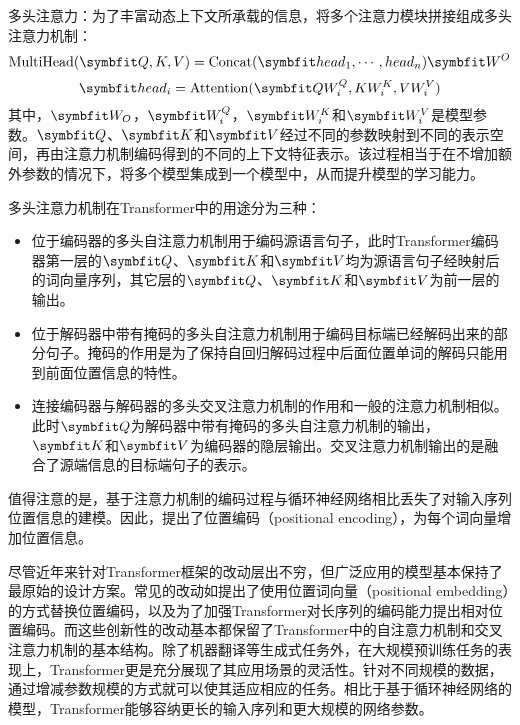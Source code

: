 {\sffamily 多头注意力：}为了丰富动态上下文所承载的信息，将多个注意力模块拼接组成多头注意力机制：
\begin{equation}
    \mathrm{MultiHead}(\Vector{Q,K,V}) = \mathrm{Concat}(\Vector{head_1, \cdots, head_n})\Vector{W^O}
\end{equation}
\begin{equation}
    \Vector{head_i} = \mathrm{Attention}(\Vector{Q W_i^Q,K W_i^K,V W_i^V})
\end{equation}
其中，$\Vector{W_O}$，$\Vector{W_i^Q}$，$\Vector{W_i^K}$和$\Vector{W_i^V}$是模型参数。$\Vector{Q}$、$\Vector{K}$和$\Vector{V}$经过不同的参数映射到不同的表示空间，再由注意力机制编码得到的不同的上下文特征表示。该过程相当于在不增加额外参数的情况下，将多个模型集成到一个模型中，从而提升模型的学习能力。

多头注意力机制在Transformer中的用途分为三种：
\begin{itemize}
    \item 位于编码器的多头自注意力机制用于编码源语言句子，此时Transformer编码器第一层的$\Vector{Q}$、$\Vector{K}$和$\Vector{V}$均为源语言句子经映射后的词向量序列，其它层的$\Vector{Q}$、$\Vector{K}$和$\Vector{V}$为前一层的输出。
    \item 位于解码器中带有掩码的多头自注意力机制用于编码目标端已经解码出来的部分句子。掩码的作用是为了保持自回归解码过程中后面位置单词的解码只能用到前面位置信息的特性。
    \item 连接编码器与解码器的多头交叉注意力机制的作用和一般的注意力机制相似。此时$\Vector{Q}$为解码器中带有掩码的多头自注意力机制的输出，$\Vector{K}$和$\Vector{V}$为编码器的隐层输出。交叉注意力机制输出的是融合了源端信息的目标端句子的表示。
\end{itemize}

值得注意的是，基于注意力机制的编码过程与循环神经网络相比丢失了对输入序列位置信息的建模。因此，提出了位置编码（positional encoding），为每个词向量增加位置信息。%

尽管近年来针对Transformer框架的改动层出不穷，但广泛应用的模型基本保持了最原始的设计方案。常见的改动如提出了使用位置词向量（positional embedding）的方式替换位置编码，以及为了加强Transformer对长序列的编码能力提出相对位置编码。而这些创新性的改动基本都保留了Transformer中的自注意力机制和交叉注意力机制的基本结构。除了机器翻译等生成式任务外，在大规模预训练任务的表现上，Transformer更是充分展现了其应用场景的灵活性\citep{radfordimproving,devlin2019bert,liu2019roberta,lewis2020bart,raffel2020exploring}。针对不同规模的数据，通过增减参数规模的方式就可以使其适应相应的任务。相比于基于循环神经网络的模型，Transformer能够容纳更长的输入序列和更大规模的网络参数。


